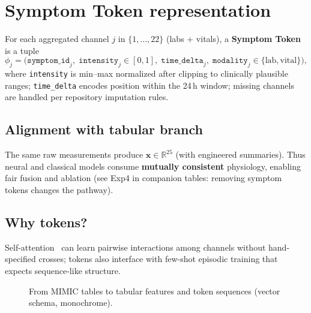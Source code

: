 \section{Symptom Token representation}
\label{sec:tokens}

\begin{definition}
For each aggregated channel $j$ in $\{1,\ldots,22\}$ (labs + vitals), a \textbf{Symptom Token} is a tuple
\[
  \phi_j = \bigl(\texttt{symptom\_id}_j,\; \texttt{intensity}_j \in [0,1],\; \texttt{time\_delta}_j,\; \texttt{modality}_j \in \{\text{lab},\text{vital}\}\bigr),
\]
where \texttt{intensity} is min--max normalized after clipping to clinically plausible ranges; \texttt{time\_delta} encodes position within the 24\,h window; missing channels are handled per repository imputation rules.
\end{definition}

\subsection{Alignment with tabular branch}
The same raw measurements produce $\mathbf{x} \in \mathbb{R}^{25}$ (with engineered summaries). Thus neural and classical models consume \textbf{mutually consistent} physiology, enabling fair fusion and ablation (see Exp4 in companion tables: removing symptom tokens changes the pathway).

\subsection{Why tokens?}
Self-attention~\citep{vaswani2017attention} can learn pairwise interactions among channels without hand-specified crosses; tokens also interface with few-shot episodic training that expects sequence-like structure.

\begin{figure}[htbp]
  \centering
  \resizebox{\textwidth}{!}{}
  \caption{From MIMIC tables to tabular features and token sequences (vector schema, monochrome).}
  \label{fig:schema_c}
\end{figure}

